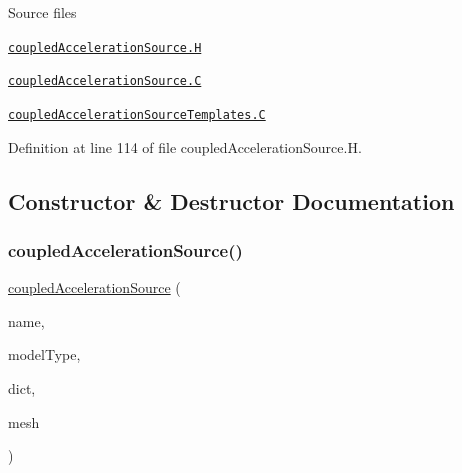 \begin{DoxyParagraph}{Source files}

\begin{DoxyItemize}
\item \href{../../../home/carlo/data/GeN-Foam/GeN-Foam_ffn/GeN-Foam/GeN-Foam/FMU4FOAM/ECI4FOAM/src/externalComm/externalIO/input/fvOptions/coupledAccelerationSource/coupledAccelerationSource.H}{\tt coupled\+Acceleration\+Source.\+H} 
\item \href{../../../home/carlo/data/GeN-Foam/GeN-Foam_ffn/GeN-Foam/GeN-Foam/FMU4FOAM/ECI4FOAM/src/externalComm/externalIO/input/fvOptions/coupledAccelerationSource/coupledAccelerationSource.C}{\tt coupled\+Acceleration\+Source.\+C} 
\item \href{../../../home/carlo/data/GeN-Foam/GeN-Foam_ffn/GeN-Foam/GeN-Foam/FMU4FOAM/ECI4FOAM/src/externalComm/externalIO/input/fvOptions/coupledAccelerationSource/coupledAccelerationSourceTemplates.C}{\tt coupled\+Acceleration\+Source\+Templates.\+C} 
\end{DoxyItemize}
\end{DoxyParagraph}


Definition at line 114 of file coupled\+Acceleration\+Source.\+H.



\subsection{Constructor \& Destructor Documentation}
\mbox{\label{classFoam_1_1fv_1_1coupledAccelerationSource_af602dd4c3a64d8abdf58db6290d1f774}} 
\subsubsection{\texorpdfstring{coupled\+Acceleration\+Source()}{coupledAccelerationSource()}\hspace{0.1cm}{\footnotesize\ttfamily [1/2]}}
{\footnotesize\ttfamily \hyperlink{classFoam_1_1fv_1_1coupledAccelerationSource}{coupled\+Acceleration\+Source} (\begin{DoxyParamCaption}\item[{const word \&}]{name,  }\item[{const word \&}]{model\+Type,  }\item[{const dictionary \&}]{dict,  }\item[{const fv\+Mesh \&}]{mesh }\end{DoxyParamCaption})}



